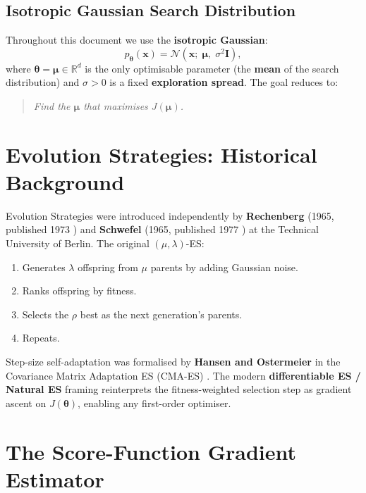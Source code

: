 \documentclass[12pt, a4paper]{article}
\newcommand{\bmu}{\boldsymbol{\mu}}
\newcommand{\btheta}{\boldsymbol{\theta}}
\newcommand{\bx}{\mathbf{x}}
\newcommand{\RR}{\mathbb{R}}
\newcommand{\NN}{\mathcal{N}}
\begin{document}
\subsection{Isotropic Gaussian Search Distribution}

Throughout this document we use the \textbf{isotropic Gaussian}:
\begin{equation}
  p_{\btheta}(\bx) = \NN\!\left(\bx;\; \bmu,\; \sigma^2 \mathbf{I}\right),
\end{equation}
where $\btheta = \bmu \in \RR^d$ is the only optimisable parameter
(the \textbf{mean} of the search distribution) and
$\sigma > 0$ is a fixed \textbf{exploration spread}.
The goal reduces to:
\begin{quote}
  \itshape Find the $\bmu$ that maximises $J(\bmu)$.
\end{quote}

\section{Evolution Strategies: Historical Background}
\label{sec:history}

Evolution Strategies were introduced independently by
\textbf{Rechenberg} (1965, published 1973 \cite{rechenberg1973}) and
\textbf{Schwefel} (1965, published 1977 \cite{schwefel1977}) at the
Technical University of Berlin.
The original $(\mu,\lambda)$-ES:
\begin{enumerate}
  \item Generates $\lambda$ offspring from $\mu$ parents by adding Gaussian noise.
  \item Ranks offspring by fitness.
  \item Selects the $\rho$ best as the next generation's parents.
  \item Repeats.
\end{enumerate}
Step-size self-adaptation was formalised by \textbf{Hansen and Ostermeier}
in the Covariance Matrix Adaptation ES (CMA-ES) \cite{hansen2001}.
The modern \textbf{differentiable ES / Natural ES} framing
\cite{wierstra2008, wierstra2014} reinterprets the fitness-weighted
selection step as gradient ascent on $J(\btheta)$, enabling any
first-order optimiser.

\section{The Score-Function Gradient Estimator}
\label{sec:score}
\end{document}
